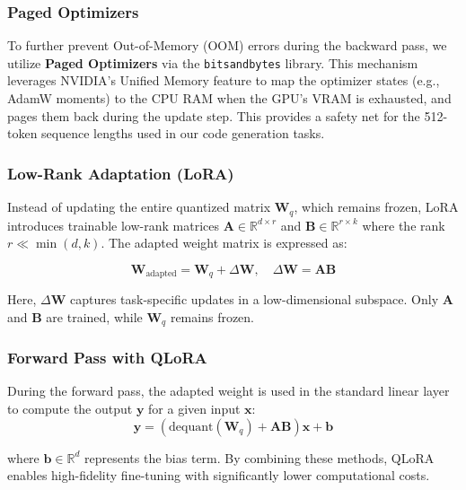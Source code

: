 \subsubsection{Paged Optimizers}
To further prevent Out-of-Memory (OOM) errors during the backward pass, we utilize \textbf{Paged Optimizers} via the \texttt{bitsandbytes} library. This mechanism leverages NVIDIA's Unified Memory feature to map the optimizer states (e.g., AdamW moments) to the CPU RAM when the GPU's VRAM is exhausted, and pages them back during the update step. This provides a safety net for the 512-token sequence lengths used in our code generation tasks.

\subsubsection{Low-Rank Adaptation (LoRA)}
Instead of updating the entire quantized matrix $\mathbf{W}_q$, which remains frozen, LoRA introduces trainable low-rank matrices $\mathbf{A} \in \mathbb{R}^{d \times r}$ and $\mathbf{B} \in \mathbb{R}^{r \times k}$ where the rank $r \ll \min(d,k)$. The adapted weight matrix is expressed as:

\begin{equation}
\mathbf{W}_{\text{adapted}} = \mathbf{W}_q + \Delta \mathbf{W}, \quad \Delta \mathbf{W} = \mathbf{A} \mathbf{B}
\end{equation}

Here, $\Delta \mathbf{W}$ captures task-specific updates in a low-dimensional subspace. Only $\mathbf{A}$ and $\mathbf{B}$ are trained, while $\mathbf{W}_q$ remains frozen.

\subsubsection{Forward Pass with QLoRA}
During the forward pass, the adapted weight is used in the standard linear layer to compute the output $\mathbf{y}$ for a given input $\mathbf{x}$:
\begin{equation}
\mathbf{y} = (\text{dequant}(\mathbf{W}_q) + \mathbf{A}\mathbf{B}) \mathbf{x} + \mathbf{b}
\end{equation}

where $\mathbf{b} \in \mathbb{R}^d$ represents the bias term. By combining these methods, QLoRA enables high-fidelity fine-tuning with significantly lower computational costs.

